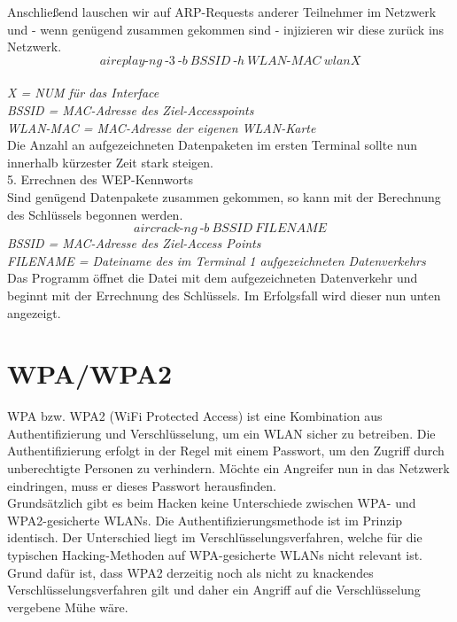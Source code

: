 Anschließend lauschen wir auf ARP-Requests anderer Teilnehmer im Netzwerk und - wenn genügend zusammen gekommen sind - injizieren wir diese zurück ins Netzwerk.
$$aireplay\text{-}ng~\text{-}3~\text{-}b~BSSID~\text{-}h~WLAN\text{-}MAC~wlanX$$\\
\textit{X = NUM für das Interface}\\
\textit{BSSID = MAC-Adresse des Ziel-Accesspoints}\\
\textit{WLAN-MAC = MAC-Adresse der eigenen WLAN-Karte}\\

Die Anzahl an aufgezeichneten Datenpaketen im ersten Terminal sollte nun innerhalb kürzester Zeit stark steigen.\\

{\Large 5. Errechnen des WEP-Kennworts}\\
Sind genügend Datenpakete zusammen gekommen, so kann mit der Berechnung des Schlüssels begonnen werden.
$$aircrack\text{-}ng~\text{-}b~BSSID~FILENAME$$
\textit{BSSID = MAC-Adresse des Ziel-Access Points}\\
\textit{FILENAME = Dateiname des im Terminal 1 aufgezeichneten Datenverkehrs}\\

Das Programm öffnet die Datei mit dem aufgezeichneten Datenverkehr und beginnt mit der Errechnung des Schlüssels. Im Erfolgsfall wird dieser nun unten angezeigt.

\section{WPA/WPA2}


WPA bzw. WPA2 (WiFi Protected Access) ist eine Kombination aus Authentifizierung und Verschlüsselung, um ein WLAN sicher zu betreiben. Die Authentifizierung erfolgt in der Regel mit einem Passwort, um den Zugriff durch unberechtigte Personen zu verhindern. Möchte ein Angreifer nun in das Netzwerk eindringen, muss er dieses Passwort herausfinden.\\


Grundsätzlich gibt es beim Hacken keine Unterschiede zwischen WPA- und WPA2-gesicherte WLANs. Die Authentifizierungsmethode ist im Prinzip identisch. Der Unterschied liegt im Verschlüsselungsverfahren, welche für die typischen Hacking-Methoden auf WPA-gesicherte WLANs nicht relevant ist.\\ Grund dafür ist, dass WPA2 derzeitig noch als nicht zu knackendes Verschlüsselungsverfahren
gilt und daher ein Angriff auf die Verschlüsselung vergebene Mühe wäre. \\

